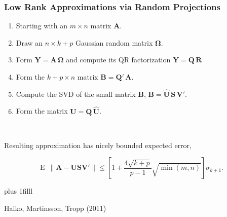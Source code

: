 \documentclass[t]{beamer}\usepackage[]{graphicx}\usepackage[]{color}
\newcommand{\vvfill}{\vskip0pt plus 1filll}
\begin{document}

\begin{frame}
\frametitle{Low Rank Approximations via Random Projections}

\begin{enumerate}
\item Starting with an $m \times n$ matrix $\bm{A}$.
\item Draw an $n \times k+p$ Gaussian random matrix $\bm{\Omega}$.
\item Form $\bm{Y} = \bm{A}\,\bm{\Omega}$ and compute its QR factorization $\bm{Y} = \bm{Q}\,\bm{R}$
\item Form the $k+p \times n$ matrix $\bm{B}=\bm{Q}'\,\bm{A}$.
\item Compute the SVD of the small matrix $\bm{B}$, $\bm{B} = \bm{\hat{U}}\,\bm{S}\,\bm{V}'$.
\item Form the matrix $\bm{U} = \bm{Q} \, \bm{\hat{U}}$.
\end{enumerate}

~\\ \pause

Resulting approximation has nicely bounded expected error,

\[ \text{E } \, \| \bm{A} - \bm{U}\bm{S}\bm{V}'\| \leq \left[1 + \frac{4\sqrt{k+p}}{p-1} \sqrt{\min(m,n)} \right] \sigma_{k+1}. \]

\vvfill

{\footnotesize
\begin{center}
Halko, Martinsson, Tropp (2011)
\end{center}
}
\end{frame}


\end{document}
